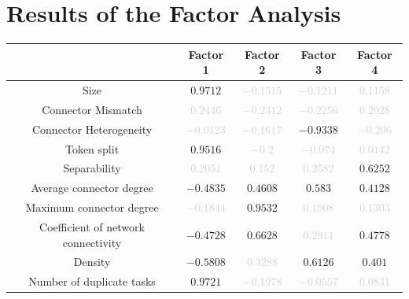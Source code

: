\documentclass[a4paper]{article}
\begin{document}
\section*{Results of the Factor Analysis}
\begin{center}
\begin{tabular}{ccccc} \toprule 
 & Factor 1 & Factor 2 & Factor 3 & Factor 4 \\ \midrule 
Size & $0.9712$ & \textcolor{lightgray}{$-0.1515$} & \textcolor{lightgray}{$-0.1211$} & \textcolor{lightgray}{$0.1158$} \\ 
Connector Mismatch & \textcolor{lightgray}{$0.2446$} & \textcolor{lightgray}{$-0.2312$} & \textcolor{lightgray}{$-0.2256$} & \textcolor{lightgray}{$0.2028$} \\ 
Connector Heterogeneity & \textcolor{lightgray}{$-0.0123$} & \textcolor{lightgray}{$-0.1617$} & $-0.9338$ & \textcolor{lightgray}{$-0.206$} \\ 
Token split & $0.9516$ & \textcolor{lightgray}{$-0.2$} & \textcolor{lightgray}{$-0.074$} & \textcolor{lightgray}{$0.0142$} \\ 
Separability & \textcolor{lightgray}{$0.2051$} & \textcolor{lightgray}{$0.152$} & \textcolor{lightgray}{$0.2582$} & $0.6252$ \\ 
Average connector degree & $-0.4835$ & $0.4608$ & $0.583$ & $0.4128$ \\ 
Maximum connector degree & \textcolor{lightgray}{$-0.1844$} & $0.9532$ & \textcolor{lightgray}{$0.1908$} & \textcolor{lightgray}{$0.1303$} \\ 
Coefficient of network connectivity & $-0.4728$ & $0.6628$ & \textcolor{lightgray}{$0.2911$} & $0.4778$ \\ 
Density & $-0.5808$ & \textcolor{lightgray}{$0.3288$} & $0.6126$ & $0.401$ \\ 
Number of duplicate tasks & $0.9721$ & \textcolor{lightgray}{$-0.1978$} & \textcolor{lightgray}{$-0.0557$} & \textcolor{lightgray}{$0.0831$} \\ 
\bottomrule
\end{tabular}
\end{center}
\end{document}
